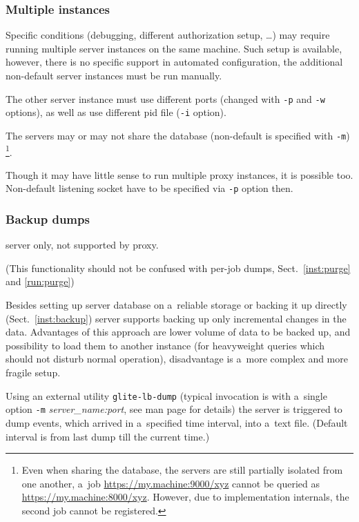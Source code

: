 \subsubsection{Multiple instances}


Specific conditions (\eg debugging, different authorization setup, \dots)
may require running multiple \LB server instances
on the same machine.
Such setup is available, however, there is no specific support in automated
configuration, the additional non-default server instances must be run manually.

The other server instance must use different ports (changed with \verb'-p'
and \verb'-w' options), as well as use different pid file (\verb'-i' option).

The servers may or may not share the database (non-default is specified
with  \verb'-m')%
\footnote{Even when sharing the database, the servers are still 
partially isolated from
one another, \eg a~job \url{https://my.machine:9000/xyz} cannot be queried 
as \url{https://my.machine:8000/xyz}.
However, due to implementation internals, the second job cannot be registered.}.

Though it may have little sense to run multiple \LB proxy instances, it is possible too.
Non-default listening socket have to be specified via \verb'-p' option then.



\subsubsection{Backup dumps}
\label{run:dump}

\LB server only, not supported by proxy.

(This functionality should not be confused with per-job dumps, Sect.~\ref{inst:purge} and \ref{run:purge})

Besides setting up \LB server database on a~reliable storage or
backing it up directly (Sect.~\ref{inst:backup})
\LB server supports backing up only incremental changes in the data.
Advantages of this approach are lower volume of data to be backed up,
and possibility to load them to another instance (\eg for heavyweight
queries which should not disturb normal operation), disadvantage is
a~more complex and more fragile setup. 

Using an external utility \verb'glite-lb-dump' (typical invocation is with
a~single option \verb'-m' \emph{server\_name:port}, see man page for
details) the server is triggered to dump events, which arrived in
a~specified time interval, into a~text file. (Default interval is from last
dump till the current time.)

